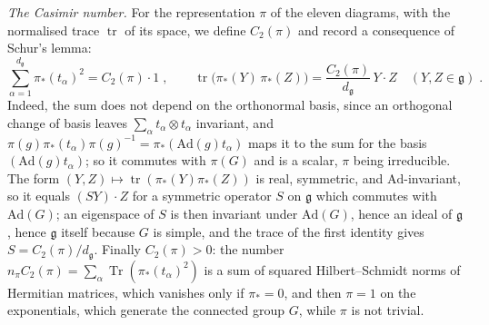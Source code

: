 \documentclass[11pt]{preprint}
\newcommand{\tr}{\operatorname{tr}}
\numberwithin{equation}{section}
\theoremstyle{definition}
\theoremstyle{remark}
\theoremstyle{plain}
\begin{document}
\emph{The Casimir number.} For the representation $\pi$ of the eleven diagrams, with the normalised trace $\tr$ of its space, we define $C_2(\pi)$ and record a consequence of Schur's lemma:
\begin{equation}\label{eq:casimir-number}
    \sum_{\alpha=1}^{d_{\mathfrak g}}\pi_*(t_\alpha)^2 = C_2(\pi) \cdot 1\;,
    \qquad
    \tr\bigl(\pi_*(Y)\,\pi_*(Z)\bigr) = \frac{C_2(\pi)}{d_{\mathfrak g}}\,Y \cdot Z \quad (Y, Z \in \mathfrak g)\;.
\end{equation}
Indeed, the sum does not depend on the orthonormal basis, since an orthogonal change of basis leaves $\sum_\alpha t_\alpha \otimes t_\alpha$ invariant, and $\pi(g)\pi_*(t_\alpha)\pi(g)^{-1} = \pi_*(\mathrm{Ad}(g)t_\alpha)$ maps it to the sum for the basis $(\mathrm{Ad}(g)t_\alpha)$; so it commutes with $\pi(G)$ and is a scalar, $\pi$ being irreducible. The form $(Y, Z) \mapsto \tr(\pi_*(Y)\pi_*(Z))$ is real, symmetric, and $\mathrm{Ad}$-invariant, so it equals $(SY) \cdot Z$ for a symmetric operator $S$ on $\mathfrak g$ which commutes with $\mathrm{Ad}(G)$; an eigenspace of $S$ is then invariant under $\mathrm{Ad}(G)$, hence an ideal of $\mathfrak g$, hence $\mathfrak g$ itself because $G$ is simple, and the trace of the first identity gives $S = C_2(\pi)/d_{\mathfrak g}$. Finally $C_2(\pi) > 0$: the number $n_\pi C_2(\pi) = \sum_\alpha\operatorname{Tr}(\pi_*(t_\alpha)^2)$ is a sum of squared Hilbert--Schmidt norms of Hermitian matrices, which vanishes only if $\pi_* = 0$, and then $\pi = 1$ on the exponentials, which generate the connected group $G$, while $\pi$ is not trivial.
\end{document}
